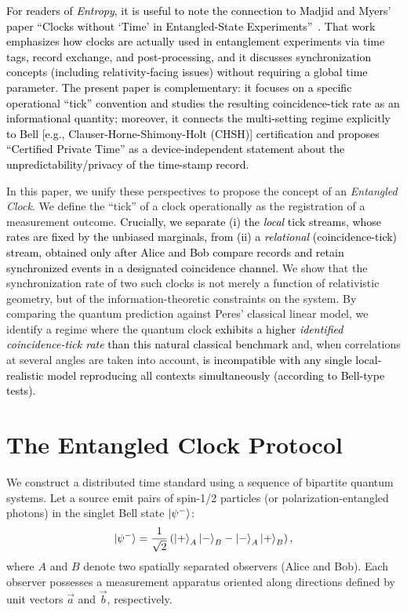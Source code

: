 \documentclass[reprint,aps,pra,longbibliography]{revtex4-2}
\newcommand{\rev}[1]{\textcolor{black}{#1}} %
\newcommand{\revG}[1]{\textcolor{black}{#1}} %
\newcommand{\revA}[1]{\textcolor{black}{#1}} %
\begin{document}
\revG{For readers of \emph{Entropy}, it is useful to note the connection to Madjid and Myers' paper ``Clocks without `Time' in Entangled-State Experiments''~\cite{MadjidMyers2020}. That work emphasizes how clocks are actually used in entanglement experiments via time tags, record exchange, and post-processing, and it discusses synchronization concepts (including relativity-facing issues) without requiring a global time parameter. The present paper is complementary: it focuses on a specific operational ``tick'' convention and studies the resulting coincidence-tick rate as an informational quantity; moreover, it connects the multi-setting regime explicitly to Bell [e.g., Clauser-Horne-Shimony-Holt (CHSH)] certification and proposes ``Certified Private Time'' as a device-independent statement about the unpredictability/privacy of the time-stamp record.}

In this paper, we unify these perspectives to propose the concept of an \emph{Entangled Clock}. We define the ``tick'' of a clock operationally as the registration of a measurement outcome. \rev{Crucially, we separate (i) the \emph{local} tick streams, whose rates are fixed by the unbiased marginals, from (ii) a \revA{\emph{relational}} (coincidence-tick) stream, obtained only after Alice and Bob compare records and retain synchronized events in a designated coincidence channel.} We show that the synchronization rate of two such clocks is not merely a function of relativistic geometry, but of the information-theoretic constraints on the system. By comparing the quantum prediction against Peres' classical linear model, we identify a regime where the quantum clock \rev{exhibits a higher \emph{identified coincidence-tick rate} than this natural classical benchmark} and, when correlations at several angles are taken into account, \rev{is incompatible with any single local-realistic model reproducing all contexts simultaneously (according to Bell-type tests).}

\section{The Entangled Clock Protocol}

We construct a distributed time standard using a sequence of bipartite quantum systems. Let a source emit pairs of spin-1/2 particles (or polarization-entangled photons) in the singlet Bell state $\ket{\psi^-}$:
\begin{equation}
\ket{\psi^-} = \frac{1}{\sqrt{2}} \left( \ket{+}_A \ket{-}_B - \ket{-}_A \ket{+}_B \right),
\end{equation}
where $A$ and $B$ denote two spatially separated observers (Alice and Bob). Each observer possesses a measurement apparatus oriented along directions defined by unit vectors $\vec{a}$ and $\vec{b}$, respectively.
\end{document}

